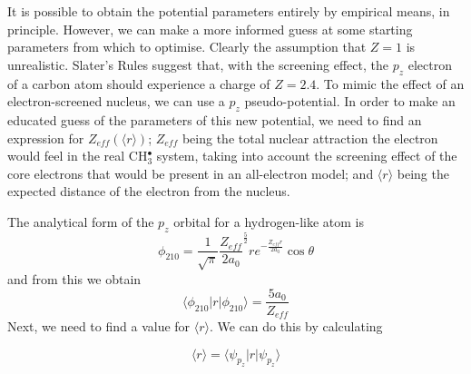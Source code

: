 \documentclass[12pt]{article}
\begin{document}
It is possible to obtain the potential parameters entirely by empirical means, in principle. However, we can make a more informed guess at some starting parameters from which to optimise. Clearly the assumption that \(Z = 1\) is unrealistic. Slater's Rules\cite{slatersrules} suggest that, with the screening effect, the \(p_{z}\) electron of a carbon atom should experience a charge of \(Z = 2.4\). To mimic the effect of an electron-screened nucleus, we can use a \(p_{z}\) pseudo-potential. In order to make an educated guess of the parameters of this new potential, we need to find an expression for \(Z_{eff}(\langle r \rangle)\); \(Z_{eff}\) being the total nuclear attraction the electron would feel in the real CH\(^{\bullet}_{3}\) system, taking into account the screening effect of the core electrons that would be present in an all-electron model; and \( \langle r \rangle \) being the expected distance of the electron from the nucleus.

The analytical form of the \(p_{z}\) orbital for a hydrogen-like atom is\cite{nyu_h_solutions}
\begin{equation}
\phi_{210} = \frac{1}{\sqrt{\pi}} \frac{Z_{eff}}{2a_{0}} ^{\frac{5}{2}} re^{-\frac{Z_{eff}r}{2a_{0}}} \cos \theta
\end{equation}
and from this we obtain 
\begin{equation}
\label{equation:PsirPsi}
\langle \phi_{210} | r | \phi_{210} \rangle = \frac{5a_{0}}{Z_{eff}}
\end{equation}
Next, we need to find a value for \( \langle r \rangle \). We can do this by calculating

\begin{equation}
\langle r \rangle = \langle \psi_{p_{z}} | r | \psi_{p_{z}} \rangle
\label{equation:exp_r}
\end{equation}
\end{document}
